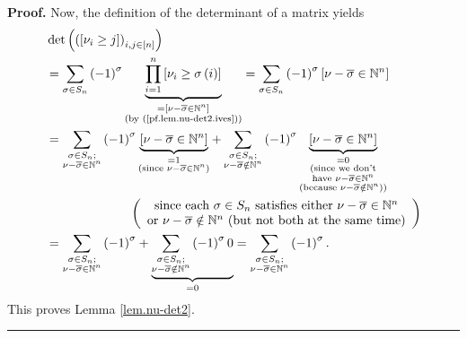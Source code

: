 \documentclass
[numbers=enddot,12pt,final,onecolumn,notitlepage,english]{scrartcl}%
\theoremstyle{definition}
\newenvironment{proof}[1][Proof]{\noindent\textbf{#1.} }{\ \rule{0.5em}{0.5em}}
\let\sumnonlimits\sum
\let\prodnonlimits\prod
\renewcommand{\sum}{\sumnonlimits\limits}
\renewcommand{\prod}{\prodnonlimits\limits}
\newenvironment{verlong}{}{}
\begin{document}
\begin{verlong}
\begin{proof}
Now, the definition of the determinant of a matrix yields%
\begin{align*}
&  \det\left(  \left(  \left[  \nu_{i}\geq j\right]  \right)  _{i,j\in\left[
n\right]  }\right) \\
&  =\sum_{\sigma\in S_{n}}\left(  -1\right)  ^{\sigma}\underbrace{\prod
_{i=1}^{n}\left[  \nu_{i}\geq\sigma\left(  i\right)  \right]  }%
_{\substack{=\left[  \nu-\overline{\sigma}\in\mathbb{N}^{n}\right]
\\\text{(by (\ref{pf.lem.nu-det2.ives}))}}}=\sum_{\sigma\in S_{n}}\left(
-1\right)  ^{\sigma}\left[  \nu-\overline{\sigma}\in\mathbb{N}^{n}\right] \\
&  =\sum_{\substack{\sigma\in S_{n};\\\nu-\overline{\sigma}\in\mathbb{N}^{n}%
}}\left(  -1\right)  ^{\sigma}\underbrace{\left[  \nu-\overline{\sigma}%
\in\mathbb{N}^{n}\right]  }_{\substack{=1\\\text{(since }\nu-\overline{\sigma
}\in\mathbb{N}^{n}\text{)}}}+\sum_{\substack{\sigma\in S_{n};\\\nu
-\overline{\sigma}\notin\mathbb{N}^{n}}}\left(  -1\right)  ^{\sigma
}\underbrace{\left[  \nu-\overline{\sigma}\in\mathbb{N}^{n}\right]
}_{\substack{=0\\\text{(since we don't}\\\text{have }\nu-\overline{\sigma}%
\in\mathbb{N}^{n}\\\text{(because }\nu-\overline{\sigma}\notin\mathbb{N}%
^{n}\text{))}}}\\
&  \ \ \ \ \ \ \ \ \ \ \ \ \ \ \ \ \ \ \ \ \left(
\begin{array}
[c]{c}%
\text{since each }\sigma\in S_{n}\text{ satisfies either }\nu-\overline
{\sigma}\in\mathbb{N}^{n}\\
\text{or }\nu-\overline{\sigma}\notin\mathbb{N}^{n}\text{ (but not both at the
same time)}%
\end{array}
\right) \\
&  =\sum_{\substack{\sigma\in S_{n};\\\nu-\overline{\sigma}\in\mathbb{N}^{n}%
}}\left(  -1\right)  ^{\sigma}+\underbrace{\sum_{\substack{\sigma\in
S_{n};\\\nu-\overline{\sigma}\notin\mathbb{N}^{n}}}\left(  -1\right)
^{\sigma}0}_{=0}=\sum_{\substack{\sigma\in S_{n};\\\nu-\overline{\sigma}%
\in\mathbb{N}^{n}}}\left(  -1\right)  ^{\sigma}.
\end{align*}
This proves Lemma \ref{lem.nu-det2}.
\end{proof}
\end{verlong}
\end{document}
